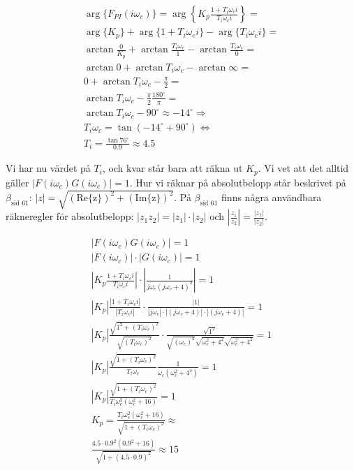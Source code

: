 \documentclass[a4paper]{article}
\newcommand{\mhb}[1]{$\beta_{\text{#1}}$}     %
\begin{document}
\begin{align*}
  \arg \{ F_{PI}(i\omega_c) \} = \arg \left \{ K_p \frac{1 + T_i \omega_c i}{T_i \omega_c i}\right \} = \\
  \arg \{ K_p \} + \arg \{ 1 + T_i \omega_c i \} -\arg\{T_i \omega_c i \} =\\
  \arctan \frac{0}{K_p} + \arctan \frac{T_i \omega_c}{1} - \arctan\frac{T_i \omega_c}{0} = \\
  \arctan 0 + \arctan T_i \omega_c - \arctan\infty = \\
  0 + \arctan T_i \omega_c - \frac{\pi}{2} = \\
  \arctan T_i \omega_c - \frac{\pi}{2}\frac{180^\circ}{\pi} = \\
  \arctan T_i \omega_c - 90^\circ \approx -14^\circ \Longrightarrow \\
  T_i \omega_c = \tan(-14^\circ +90^\circ) \Longleftrightarrow \\
  T_i = \frac{\tan 76^\circ}{0.9} \approx 4.5
\end{align*}

Vi har nu värdet på $T_i$, och kvar står bara att räkna ut $K_p$. Vi vet att det alltid gäller $|F(i\omega_c)G(i\omega_c)| = 1$. Hur vi räknar på absolutbelopp står beskrivet på \mhb{sid 61}: $|z| = \sqrt{(\text{Re\{z\}})^2 + (\text{Im\{z\}})^2}$. På \mhb{sid 61} finns några användbara räkneregler för absolutbelopp: $|z_1 z_2| = |z_1|\cdot |z_2|$ och $\left|\frac{z_1}{z_2}\right| = \frac{|z_1|}{|z_2|}$.

\begin{align*}
  |F(i\omega_c)G(i\omega_c)| = 1 \\
  |F(i\omega_c)|\cdot|G(i\omega_c)| = 1\\
  \left|K_p \frac{1 + T_i \omega_c i}{T_i \omega_c i}\right| \cdot \left|\frac{1}{j\omega_c(j\omega_c + 4)^2}\right| = 1\\
  |K_p| \frac{|1 + T_i \omega_c i|}{|T_i \omega_c i|} \cdot \frac{|1|}{|j\omega_c|\cdot|(j\omega_c + 4)|\cdot|(j\omega_c + 4)|} = 1\\
  |K_p| \frac{\sqrt{1^2 + (T_i \omega_c)^2}}{\sqrt{(T_i \omega_c)^2}} \cdot \frac{\sqrt{1^2}}{\sqrt{(\omega_c)^2}\sqrt{\omega_c^2 + 4^2}\sqrt{\omega_c^2 + 4^2}} = 1\\
  |K_p| \frac{\sqrt{1 + (T_i \omega_c)^2}}{T_i \omega_c} \frac{1}{\omega_c(\omega_c^2 + 4^2)} = 1\\
  |K_p| \frac{\sqrt{1 + (T_i \omega_c)^2}}{T_i \omega_c^2(\omega_c^2 + 16)} = 1\\
  K_p = \frac{T_i \omega_c^2(\omega_c^2 + 16)}{\sqrt{1 + (T_i \omega_c)^2}} \approx\\
  \frac{4.5 \cdot 0.9^2(0.9^2 + 16)}{\sqrt{1 + (4.5 \cdot 0.9)^2}} \approx 15
\end{align*}
\end{document}
